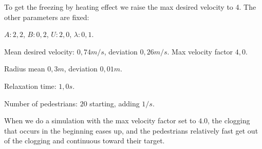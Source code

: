 To get the freezing by heating effect we raise the max desired velocity to 4.
The other parameters are fixed:

\begin{itemize*}
    \item $A: 2,2$, $B: 0,2$, $U: 2,0$, $\lambda: 0,1$.
    \item Mean desired velocity: $0,74 m/s$, deviation $0,26 m/s$. Max 
        velocity factor $4,0$.
    \item Radius mean $0,3 m$, deviation $0,01 m$.
    \item Relaxation time: $1,0 s$.
    \item Number of pedestrians: $20$ starting, adding $1/s$.
\end{itemize*}

When we do a simulation with the max velocity factor set to $4.0$, the clogging
that occurs in the beginning eases up, and the pedestrians relatively fast
get out of the clogging and continuous toward their target.

